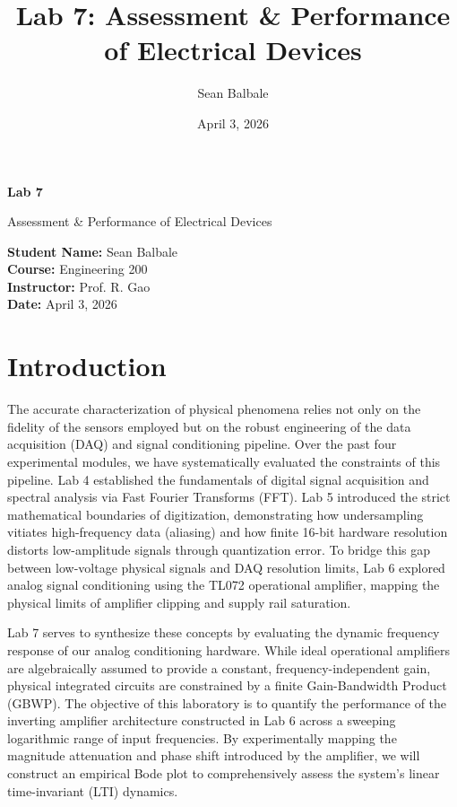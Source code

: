 \documentclass[11pt]{article}
\title{\textbf{Lab 7: Assessment \& Performance of Electrical Devices}}
\author{Sean Balbale}
\date{April 3, 2026}
\begin{document}
\begin{titlepage}
  \begin{center}
    \vspace*{1in}

    \Huge
    \textbf{Lab 7}

    \LARGE
    Assessment \& Performance of Electrical Devices

    \vspace{3in}

    \textbf{Student Name:} Sean Balbale
    \\ \textbf{Course:} Engineering 200
    \\ \textbf{Instructor:} Prof. R. Gao
    \\ \textbf{Date:} April 3, 2026

    \vfill

  \end{center}
\end{titlepage}

\newpage

\section{Introduction}
The accurate characterization of physical phenomena relies not only on the fidelity of the sensors employed but on the robust engineering of the data acquisition (DAQ) and signal conditioning pipeline. Over the past four experimental modules, we have systematically evaluated the constraints of this pipeline. Lab 4 established the fundamentals of digital signal acquisition and spectral analysis via Fast Fourier Transforms (FFT). Lab 5 introduced the strict mathematical boundaries of digitization, demonstrating how undersampling vitiates high-frequency data (aliasing) and how finite 16-bit hardware resolution distorts low-amplitude signals through quantization error. To bridge this gap between low-voltage physical signals and DAQ resolution limits, Lab 6 explored analog signal conditioning using the TL072 operational amplifier, mapping the physical limits of amplifier clipping and supply rail saturation.

Lab 7 serves to synthesize these concepts by evaluating the dynamic frequency response of our analog conditioning hardware. While ideal operational amplifiers are algebraically assumed to provide a constant, frequency-independent gain, physical integrated circuits are constrained by a finite Gain-Bandwidth Product (GBWP). The objective of this laboratory is to quantify the performance of the inverting amplifier architecture constructed in Lab 6 across a sweeping logarithmic range of input frequencies. By experimentally mapping the magnitude attenuation and phase shift introduced by the amplifier, we will construct an empirical Bode plot to comprehensively assess the system's linear time-invariant (LTI) dynamics.
\end{document}
